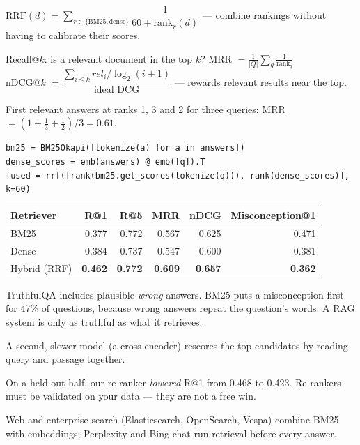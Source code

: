 \documentclass[11pt,a4paper]{article}
\begin{document}
\begin{bmath}
$\mathrm{RRF}(d)=\sum_{r\in\{\text{BM25},\text{dense}\}}\dfrac{1}{60+\mathrm{rank}_r(d)}$ --- combine rankings without having to calibrate their scores.
\end{bmath}
\begin{bmath}
Recall@$k$: is a relevant document in the top $k$? \quad MRR $=\frac1{|Q|}\sum_q\frac{1}{\mathrm{rank}_q}$\\[2pt]
nDCG@$k$ $=\dfrac{\sum_{i\le k}rel_i/\log_2(i+1)}{\text{ideal DCG}}$ --- rewards relevant results near the top.
\end{bmath}
\begin{bex}
First relevant answers at ranks 1, 3 and 2 for three queries: MRR $=(1+\tfrac13+\tfrac12)/3=0.61$.
\end{bex}
\begin{bcode}
\begin{lstlisting}
bm25 = BM25Okapi([tokenize(a) for a in answers])
dense_scores = emb(answers) @ emb([q]).T
fused = rrf([rank(bm25.get_scores(tokenize(q))), rank(dense_scores)], k=60)
\end{lstlisting}
\end{bcode}
\begin{bres}
\begin{tabular}{lrrrrr}
\toprule
Retriever & R@1 & R@5 & MRR & nDCG & Misconception@1\\
\midrule
BM25 & 0.377 & 0.772 & 0.567 & 0.625 & 0.471\\
Dense & 0.384 & 0.737 & 0.547 & 0.600 & 0.381\\
Hybrid (RRF) & \textbf{0.462} & \textbf{0.772} & \textbf{0.609} & \textbf{0.657} & \textbf{0.362}\\
\bottomrule
\end{tabular}
\end{bres}
\begin{bwarn}
TruthfulQA includes plausible \emph{wrong} answers. BM25 puts a misconception first for 47\% of questions, because wrong answers repeat the question's words. A RAG system is only as truthful as what it retrieves.
\end{bwarn}
\begin{bdef}[Re-ranking]
A second, slower model (a cross-encoder) rescores the top candidates by reading query and passage together.
\end{bdef}
\begin{bres}
On a held-out half, our re-ranker \emph{lowered} R@1 from 0.468 to 0.423. Re-rankers must be validated on your data --- they are not a free win.
\end{bres}
\begin{bapp}
Web and enterprise search (Elasticsearch, OpenSearch, Vespa) combine BM25 with embeddings; Perplexity and Bing chat run retrieval before every answer.
\end{bapp}
\end{document}
